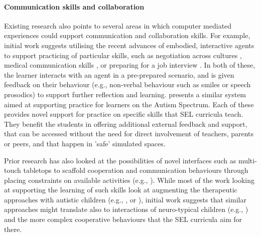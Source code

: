 \documentclass[prodmode,acmtochi]{acmsmall}
\begin{document}
\paragraph{Communication skills and collaboration} Existing research also points to several areas in which computer mediated experiences could support communication and collaboration skills. For example, initial work suggests utilising the recent advances of embodied, interactive agents to support practicing of particular skills, such as negotiation across cultures \cite{Core2006}, medical communication skills \cite{Johnsen2005}, or preparing for a job interview \cite{Hoque2013}. In both of these, the learner interacts with an agent in a pre-prepared scenario, and is given feedback on their behaviour (e.g., non-verbal behaviour such as smiles or speech prosodics) to support further reflection and learning.  presents a similar system aimed at supporting practice for learners on the Autism Spectrum. Each of these provides novel support for practice on specific skills that SEL curricula teach. They benefit the students in offering additional external feedback and support, that can be accessed without the need for direct involvement of teachers, parents or peers, and that happen in 'safe' simulated spaces.
%

Prior research has also looked at the possibilities of novel interfaces such as multi-touch tabletops to scaffold cooperation and communication behaviours through placing constraints on available activities (e.g., \cite{Yuill2012}). While most of the work looking at supporting the learning of such skills look at augmenting the therapeutic approaches with autistic children (e.g., \cite{Piper2006}, or \cite{Zarin2011}), initial work suggests that similar approaches might translate also to interactions of neuro-typical children (e.g., \cite{Hinske2009,Antle2013,Cao2010,Kharrufa2010}) and the more complex cooperative behaviours that the SEL curricula aim for there.  
\end{document}
